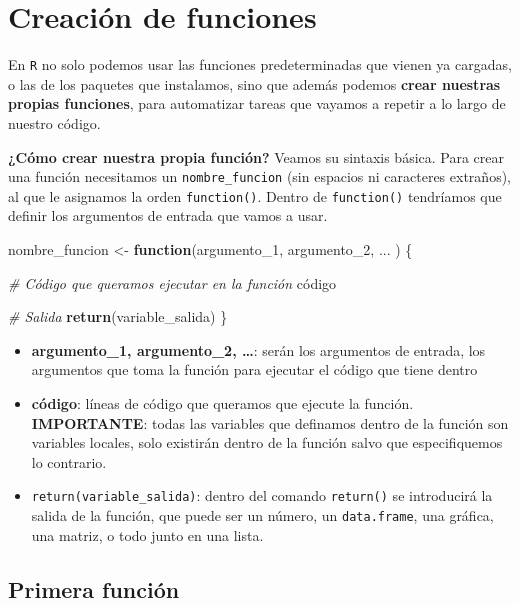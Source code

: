 \documentclass[11pt,]{book}
\newenvironment{Shaded}{\begin{snugshade}}{\end{snugshade}}
\newcommand{\CommentTok}[1]{\textcolor[rgb]{0.37,0.37,0.37}{\textit{#1}}}
\newcommand{\ControlFlowTok}[1]{\textcolor[rgb]{0.27,0.27,0.27}{\textbf{#1}}}
\newcommand{\DecValTok}[1]{\textcolor[rgb]{0.06,0.06,0.06}{#1}}
\newcommand{\KeywordTok}[1]{\textcolor[rgb]{0.27,0.27,0.27}{\textbf{#1}}}
\newcommand{\NormalTok}[1]{#1}
\newcommand{\StringTok}[1]{\textcolor[rgb]{0.5,0.5,0.5}{#1}}
\providecommand{\tightlist}{%
  \setlength{\itemsep}{0pt}\setlength{\parskip}{0pt}}
\begin{document}
\hypertarget{FUNCIONES}{%
\chapter{Creación de funciones}\label{FUNCIONES}}

En \texttt{R} no solo podemos usar las funciones predeterminadas que vienen ya cargadas, o las de los paquetes que instalamos, sino que además podemos \textbf{crear nuestras propias funciones}, para automatizar tareas que vayamos a repetir a lo largo de nuestro código.

\textbf{¿Cómo crear nuestra propia función?} Veamos su sintaxis básica. Para crear una función necesitamos un \texttt{nombre\_funcion} (sin espacios ni caracteres extraños), al que le asignamos la orden \texttt{function()}. Dentro de \texttt{function()} tendríamos que definir los argumentos de entrada que vamos a usar.

\begin{Shaded}
\begin{Highlighting}[]
\NormalTok{nombre_funcion <-}\StringTok{ }\ControlFlowTok{function}\NormalTok{(argumento_}\DecValTok{1}\NormalTok{, argumento_}\DecValTok{2}\NormalTok{, ... ) \{}
  
  \CommentTok{# Código que queramos ejecutar en la función}
\NormalTok{  código}
  
  \CommentTok{# Salida}
  \KeywordTok{return}\NormalTok{(variable_salida)}
\NormalTok{\}}
\end{Highlighting}
\end{Shaded}

\begin{itemize}
\tightlist
\item
  \textbf{argumento\_1, argumento\_2, \ldots{}}: serán los argumentos de entrada, los argumentos que toma la función para ejecutar el código que tiene dentro
\item
  \textbf{código}: líneas de código que queramos que ejecute la función. \textbf{IMPORTANTE}: todas las variables que definamos dentro de la función son variables locales, solo existirán dentro de la función salvo que especifiquemos lo contrario.
\item
  \texttt{return(variable\_salida)}: dentro del comando \texttt{return()} se introducirá la salida de la función, que puede ser un número, un \texttt{data.frame}, una gráfica, una matriz, o todo junto en una lista.
\end{itemize}

\hypertarget{primera-funciuxf3n}{%
\section{Primera función}\label{primera-funciuxf3n}}
\end{document}
